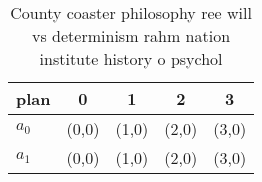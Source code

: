 \documentclass[a4paper]{article}
\begin{document}
\begin{table}
\begin{adjustbox}{width=0.5\columnwidth}
\begin{tabular}{|l|l|l|l|l|}
\hline
\textbf{plan} & \multicolumn{1}{c|}{\textbf{0}} & \multicolumn{1}{c|}{\textbf{1}} & \multicolumn{1}{c|}{\textbf{2}} & \multicolumn{1}{c|}{\textbf{3}} \\ \hline
\textbf{$a_0$}  & (0,0) & (1,0) & (2,0) & (3,0) \\ \hline
\textbf{$a_1$}  & (0,0) & (1,0) & (2,0) & (3,0) \\ \hline
\end{tabular}
\end{adjustbox}
\caption{County coaster philosophy ree will vs determinism rahm nation institute history o psychol
}
\end{table}
\end{document}
